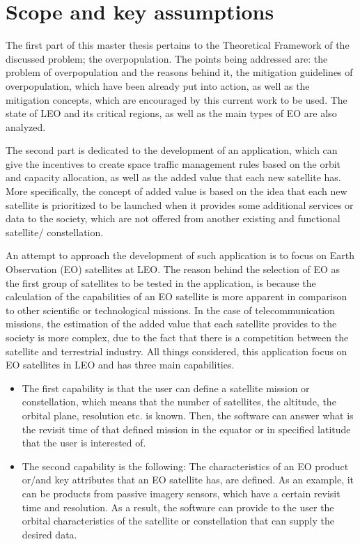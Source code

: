 \bigskip
\bigskip

\newpage
\section{Scope and key assumptions}
\label{chap:scope}
\bigskip


The first part of this master thesis pertains to the Theoretical Framework of the discussed problem; the overpopulation. The points being addressed are: the problem of overpopulation and the reasons behind it, the mitigation guidelines of overpopulation, which have been already put into action, as well as the mitigation concepts, which are encouraged by this current work to be used. The state of LEO and its critical regions, as well as the main types of EO are also analyzed.

The second part is dedicated to the development of an application, which can give the incentives to create space traffic management rules based on the orbit and capacity allocation, as well as the added value that each new satellite has. More specifically, the concept of added value is based on the idea that each new satellite is prioritized to be launched when it provides some additional services or data to the society, which are not offered from another existing and functional satellite/ constellation.

An attempt to approach the development of such application is to focus on Earth Observation (EO) satellites at LEO. The reason behind the selection of EO as the first group of satellites to be tested in the application, is because the calculation of the capabilities of an EO satellite is more apparent in comparison to other scientific or technological missions. In the case of telecommunication missions, the estimation of the added value that each satellite provides to the society is more complex, due to the fact that there is a competition between the satellite and terrestrial industry. All things considered, this application focus on EO satellites in LEO and has three main capabilities.

\begin{itemize}
\item The first capability is that the user can define a satellite mission or constellation, which means that the number of satellites, the altitude, the orbital plane, resolution etc. is known. Then, the software can answer what is the revisit time of that defined mission in the equator or in specified latitude that the user is interested of.
\item The second capability is the following: The characteristics of an EO product or/and key attributes that an EO satellite has, are defined. As an example, it can be products from passive imagery sensors, which have a certain revisit time and resolution. As a result, the software can provide to the user the orbital characteristics of the satellite or constellation that can supply the desired data.
\end{itemize}

